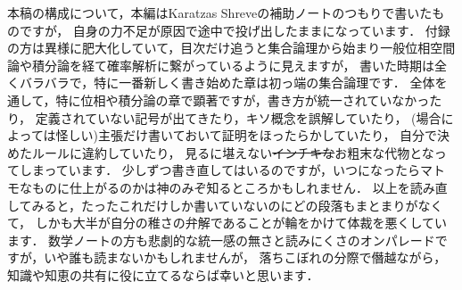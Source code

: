 本稿の構成について，本編はKaratzas Shreveの補助ノートのつもりで書いたものですが，
自身の力不足が原因で途中で投げ出したままになっています．
付録の方は異様に肥大化していて，目次だけ追うと集合論理から始まり一般位相空間論や積分論を経て確率解析に繋がっているように見えますが，
書いた時期は全くバラバラで，特に一番新しく書き始めた章は初っ端の集合論理です．
全体を通して，特に位相や積分論の章で顕著ですが，書き方が統一されていなかったり，
定義されていない記号が出てきたり，キソ概念を誤解していたり，
(場合によっては怪しい)主張だけ書いておいて証明をほったらかしていたり，
自分で決めたルールに違約していたり，
見るに堪えない\sout{インチキな}お粗末な代物となってしまっています．
少しずつ書き直してはいるのですが，いつになったらマトモなものに仕上がるのかは神のみぞ知るところかもしれません．
以上を読み直してみると，たったこれだけしか書いていないのにどの段落もまとまりがなくて，
しかも大半が自分の稚さの弁解であることが輪をかけて体裁を悪くしています．
数学ノートの方も悲劇的な統一感の無さと読みにくさのオンパレードですが，いや誰も読まないかもしれませんが，
落ちこぼれの分際で僭越ながら，知識や知恵の共有に役に立てるならば幸いと思います．
\\
\\
